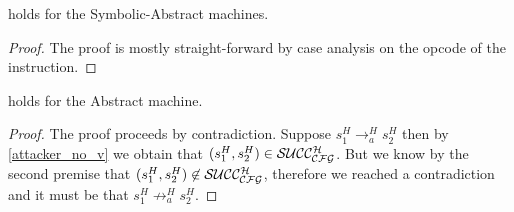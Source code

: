 \begin{lemma}
  \label{cfg_equiv_SA}
   holds for the Symbolic-Abstract machines.
\end{lemma}
\begin{proof}
  The proof is mostly straight-forward by case analysis on the
  opcode of the instruction.
\end{proof}

\begin{lemma}
  \label{av_no_attacker_A}
   holds for the Abstract machine.
\end{lemma}
\begin{proof}
  The proof proceeds by contradiction.
  Suppose $s^H_1 \to^H_a s^H_2$ then by \cref{attacker_no_v}
  we obtain that $(s^H_1,s^H_2) \in \mathcal{SUCC_\mathcal{CFG}^{H}}$. But we know
  by the second premise that $(s^H_1,s^H_2) \not \in \mathcal{SUCC_\mathcal{CFG}^{H}}$,
  therefore we reached a contradiction and it must be that
  $s^H_1 \not \to^H_a s^H_2$.
\end{proof}

